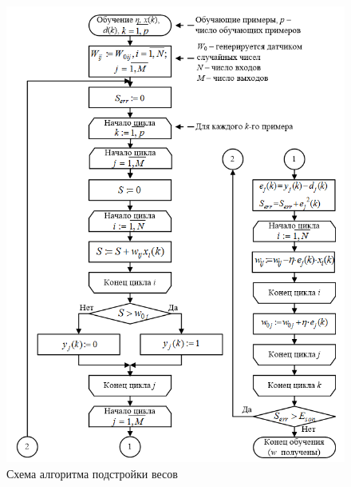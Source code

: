 \documentclass{beamer}
\begin{document}
\begin{frame}[t]
	\begin{figure}[h]
		\centering
		\includegraphics[scale=0.35]{images/lec03-alg-letters.png}
		\caption{Схема алгоритма подстройки весов}
	\end{figure}
\end{frame}
\end{document}
